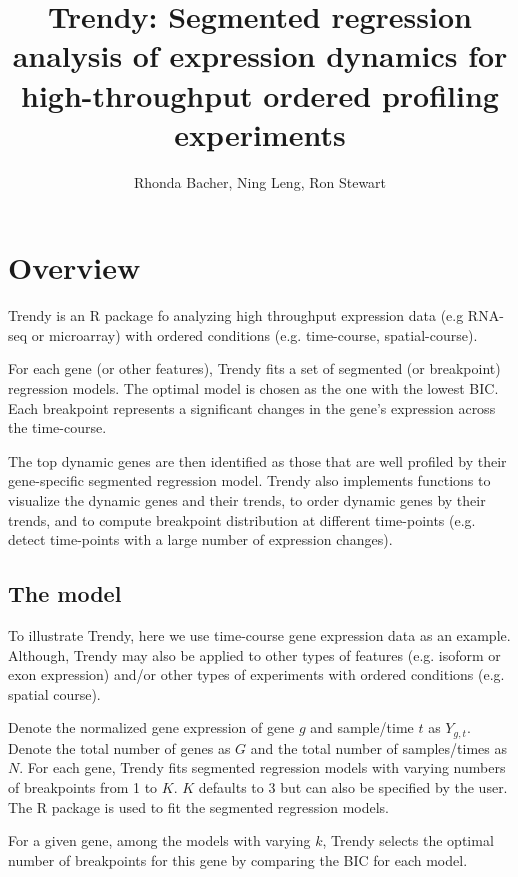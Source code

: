 \documentclass{article}\usepackage[]{graphicx}\usepackage[usenames,dvipsnames]{color}
\begin{document}
\title{Trendy: Segmented regression analysis of
expression dynamics for high-throughput ordered
profiling experiments}
\author{Rhonda Bacher, Ning Leng, Ron Stewart}
\maketitle
\tableofcontents
\setcounter{tocdepth}{2}



\section{Overview}
\label{sec:intro}
Trendy is an R package fo analyzing high throughput expression data (e.g RNA-seq or microarray) with ordered conditions (e.g. time-course, spatial-course).

For each gene (or other features), Trendy fits a set of segmented (or breakpoint) regression models. The optimal model is chosen as the one with the lowest BIC. Each breakpoint represents a significant changes in the gene’s expression across the time-course.

The top dynamic genes are then identified as those that are well profiled by their gene-specific segmented regression model. Trendy also implements functions to visualize the dynamic genes and their trends, to order 
dynamic genes by their trends, and to compute breakpoint distribution at different
time-points (e.g. detect time-points with a large number of expression changes).

\subsection{The model}
To illustrate Trendy, here we use time-course gene expression data as an example. 
Although, Trendy may also be applied to other types of features (e.g. isoform or exon expression) and/or other
types of experiments with ordered conditions (e.g. spatial course).

Denote the normalized gene expression of gene $g$ and sample/time $t$ as $Y_{g,t}$.
Denote the total number of genes as $G$ and the total number of samples/times as $N$.
For each gene, Trendy fits segmented regression models with varying numbers of breakpoints from 1 to $K$. $K$ defaults to 3 but can also
be specified by the user. The  R package is used to fit the segmented regression models.

For a given gene, among the models with varying $k$, Trendy selects the optimal
number of breakpoints for this gene by comparing the BIC for each model.
\end{document}
